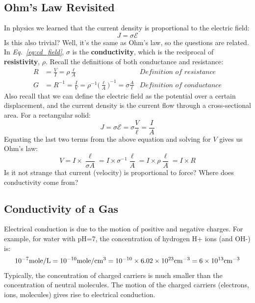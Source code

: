 \subsection{Ohm’s Law Revisited}
In physics we learned that the current density is proportional to the electric field:
    \begin{equation}
        J = \sigma \mathcal{E}
        \label{eq:cd_field}
    \end{equation}
Is this also trivial? Well, it’s the same as Ohm’s law, so the questions are related.  In \emph{Eq.~\ref{eq:cd_field}}, $\sigma$ is the \textbf{conductivity}, which is the reciprocal of \textbf{resistivity}, $\rho$.  Recall the definitions of both conductance and resistance:
    \begin{align}
        R &= \frac{V}{I} = \rho \frac{\ell}{A} &\textit{Definition of resistance}
        \label{eq:resistance}\\[1.5ex]
        G &= R^{-1} = \frac{I}{V} = {\rho}^{-1} {\bigg( \frac{\ell}{A} \bigg)}^{-1} = \sigma \frac{A}{\ell} &\textit{Definition of conductance}
        \label{eq:conductance}
    \end{align}
Also recall that we can define the electric field as the potential over a certain displacement, and the current density is the current flow through a cross-sectional area.  For a rectangular solid:
    \begin{equation*}
        J = \sigma \mathcal{E} = \sigma \frac{V}{\ell} = \frac{I}{A} 
    \end{equation*}
Equating the last two terms from the above equation and solving for $V$ gives us Ohm's law:
    \begin{equation*}
        V = I \times \frac{\ell}{{\sigma A}} = I \times {\sigma}^{-1}\frac{\ell}{{A}} = I \times \rho \frac{\ell}{{A}} = I \times R
    \end{equation*}
Is it not strange that current (velocity) is proportional to force?  Where does conductivity come from?
\subsection{Conductivity of a Gas}
Electrical conduction is due to the motion of positive and negative charges.   For example, for  water with pH=7, the concentration of hydrogen H+ ions (and OH-) is:
    \begin{equation}
        {10^{ - 7}}{\rm{mole/L}} = {\rm{1}}{{\rm{0}}^{{\rm{ - 10}}}}{\rm{mole/c}}{{\rm{m}}^{\rm{3}}}
        = {\rm{1}}{{\rm{0}}^{{\rm{ - 10}}}} \times 6.02 \times {10^{23}}{\rm{c}}{{\rm{m}}^{ - 3}}
        = 6 \times {10^{13}}{\rm{c}}{{\rm{m}}^{ - 3}}
    \end{equation}
Typically, the concentration of charged carriers is much smaller than the concentration of neutral molecules.  The motion of the charged carriers (electrons, ions, molecules) gives rise to electrical conduction.
